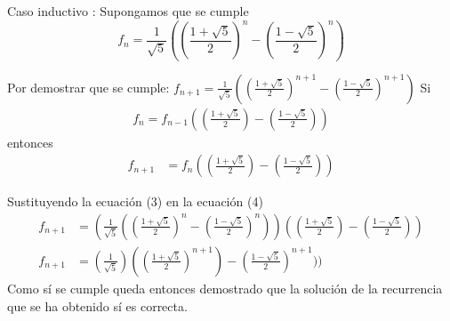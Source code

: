 \documentclass[letterpaper,11pt, fleqn]{article}
\begin{document}
Caso inductivo : Supongamos que se cumple
\begin{equation}
	f_{n} = \frac{1}{\sqrt{5}} ((\frac{1 + \sqrt{5}}{2})^{n} - (\frac{1 - \sqrt{5}}{2})^{n})
\end{equation}

\qquad\qquad Por demostrar que se cumple: $f_{n+1} = \frac{1}{\sqrt{5}} ((\frac{1 + \sqrt{5}}{2})^{n+1} - (\frac{1 - \sqrt{5}}{2})^{n+1})$ \smallbreak
\qquad\qquad Si 
\begin{equation*}
\begin{aligned}
	f_{n} = f_{n-1} ((\frac{1+\sqrt{5}}{2}) - (\frac{1-\sqrt{5}}{2}))
\end{aligned}
\end{equation*}
\qquad \qquad entonces
\begin{equation}
\begin{aligned}
	f_{n+1} &= f_{n}((\frac{1+\sqrt{5}}{2}) - (\frac{1-\sqrt{5}}{2}))
\end{aligned}
\end{equation}

\qquad \qquad Sustituyendo la ecuación (3) en la ecuación (4)
\begin{equation*}
\begin{aligned}
	f_{n+1} &= (\frac{1}{\sqrt{5}} ((\frac{1 + \sqrt{5}}{2})^{n} - (\frac{1 - \sqrt{5}}{2})^{n}))((\frac{1+\sqrt{5}}{2}) - (\frac{1-\sqrt{5}}{2}))\\
	f_{n+1} &= (\frac{1}{\sqrt{5}}) ((\frac{1 + \sqrt{5}}{2})^{n+1}) - (\frac{1 - \sqrt{5}}{2})^{n+1}))
\end{aligned}
\end{equation*}
\qquad Como sí se cumple queda entonces demostrado que la solución de la recurrencia que se ha obtenido sí es correcta.
\end{document}

